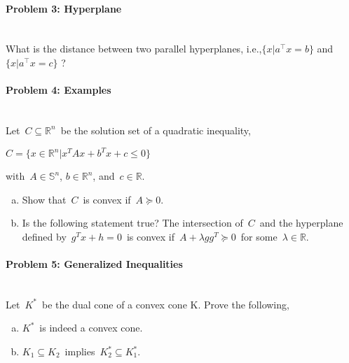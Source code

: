 \documentclass[12pt,a4paper,oneside]{ctexart}
\newenvironment{solution}
{\color{blue} \paragraph{Solution.}}
{\newline \qed}
\begin{document}

\paragraph{Problem 3: Hyperplane}
~\\

\noindent
What is the distance between two parallel hyperplanes, i.e.,$\{x|a^\top x=b\}$ and $\{x|a^\top x=c\}$ ?


\paragraph{Problem 4: Examples}
~\\

\noindent
Let~$C \subseteq \mathbb{R}^n$~be the solution set of a quadratic inequality,
\begin{center}
$C = \{x \in \mathbb{R}^n|x^TAx + b^Tx + c \leqslant 0\}$
\end{center}
with~$A \in \mathbb{S}^n$, $b \in \mathbb{R}^n$, and~$c \in \mathbb{R}$.
\begin{enumerate}[a)]
    \item Show that~$C$~is convex if~$A \succeq 0$.

    \item Is the following statement true? The intersection of~$C$~and the hyperplane defined by~$g^Tx+h=0$~is convex if~$A+\lambda gg^T \succeq 0$~for some~$\lambda \in \mathbb{R}$.
\end{enumerate}


\paragraph{Problem 5: Generalized Inequalities}
~\\

\noindent
Let~$K^*$~be the dual cone of a convex cone K. Prove the following,
\begin{enumerate}[a)]
    \item $K^*$~is indeed a convex cone.

    \item $K_1 \subseteq K_2$~implies~$K^*_2 \subseteq K^*_1$.

\end{enumerate}
\end{document}
